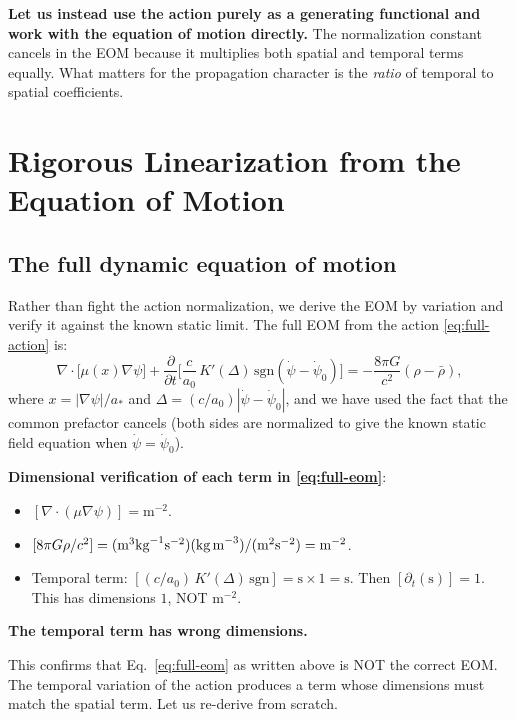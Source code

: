 \documentclass[11pt]{article}
\begin{document}
\textbf{Let us instead use the action purely as a generating functional and work with the equation of motion directly.} The normalization constant cancels in the EOM because it multiplies both spatial and temporal terms equally. What matters for the propagation character is the \emph{ratio} of temporal to spatial coefficients.


\section{Rigorous Linearization from the Equation of Motion}

\subsection{The full dynamic equation of motion}

Rather than fight the action normalization, we derive the EOM by variation and verify it against the known static limit. The full EOM from the action \eqref{eq:full-action} is:
\begin{equation}
\nabla\cdot\bigl[\mu(x)\nabla\psi\bigr]
+ \frac{\partial}{\partial t}\biggl[\frac{c}{a_0}\,K'(\Delta)\,\text{sgn}(\dot\psi - \dot\psi_0)\biggr]
= -\frac{8\pi G}{c^2}(\rho - \bar\rho),
\label{eq:full-eom}
\end{equation}
where $x = |\nabla\psi|/a_*$ and $\Delta = (c/a_0)|\dot\psi - \dot\psi_0|$, and we have used the fact that the common prefactor cancels (both sides are normalized to give the known static field equation when $\dot\psi = \dot\psi_0$).

\textbf{Dimensional verification of each term in \eqref{eq:full-eom}}:
\begin{itemize}[nosep]
\item $[\nabla\cdot(\mu\nabla\psi)] = \text{m}^{-2}$. \checkmark
\item $[8\pi G\rho/c^2] = (\text{m}^3\text{kg}^{-1}\text{s}^{-2})(\text{kg\,m}^{-3})/(\text{m}^2\text{s}^{-2}) = \text{m}^{-2}$. \checkmark
\item Temporal term: $[(c/a_0)\,K'(\Delta)\,\text{sgn}] = \text{s} \times 1 = \text{s}$. Then $[\partial_t(\text{s})] = 1$. This has dimensions $1$, NOT $\text{m}^{-2}$.
\end{itemize}

\textbf{The temporal term has wrong dimensions.}

This confirms that Eq.~\eqref{eq:full-eom} as written above is NOT the correct EOM. The temporal variation of the action produces a term whose dimensions must match the spatial term. Let us re-derive from scratch.
\end{document}
